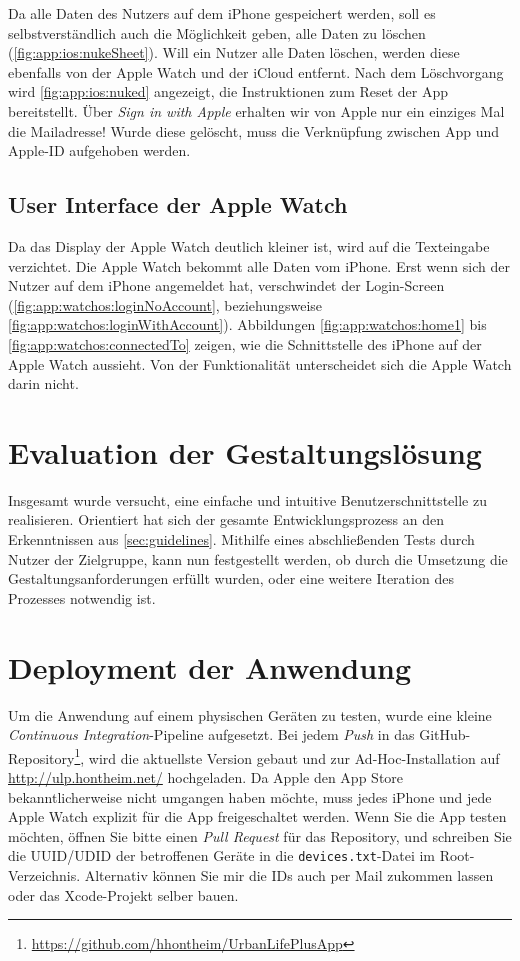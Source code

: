 Da alle Daten des Nutzers auf dem iPhone gespeichert werden, soll es selbstverständlich auch die Möglichkeit geben, alle Daten zu löschen (\autoref{fig:app:ios:nukeSheet}). Will ein Nutzer alle Daten löschen, werden diese ebenfalls von der Apple Watch und der iCloud entfernt. Nach dem Löschvorgang wird \autoref{fig:app:ios:nuked} angezeigt, die Instruktionen zum Reset der App bereitstellt. Über \emph{Sign in with Apple} erhalten wir von Apple nur ein einziges Mal die Mailadresse! Wurde diese gelöscht, muss die Verknüpfung zwischen App und Apple-ID aufgehoben werden.

\subsection{User Interface der Apple Watch}

Da das Display der Apple Watch deutlich kleiner ist, wird auf die Texteingabe verzichtet. Die Apple Watch bekommt alle Daten vom iPhone. Erst wenn sich der Nutzer auf dem iPhone angemeldet hat, verschwindet der Login-Screen (\autoref{fig:app:watchos:loginNoAccount}, beziehungsweise \ref{fig:app:watchos:loginWithAccount}). Abbildungen \ref{fig:app:watchos:home1} bis \ref{fig:app:watchos:connectedTo} zeigen, wie die Schnittstelle des iPhone auf der Apple Watch aussieht. Von der Funktionalität unterscheidet sich die Apple Watch darin nicht.

\section{Evaluation der Gestaltungslösung}

Insgesamt wurde versucht, eine einfache und intuitive Benutzerschnittstelle zu realisieren. Orientiert hat sich der gesamte Entwicklungsprozess an den Erkenntnissen aus \autoref{sec:guidelines}. Mithilfe eines abschließenden Tests durch Nutzer der Zielgruppe, kann nun festgestellt werden, ob durch die Umsetzung die Gestaltungsanforderungen erfüllt wurden, oder eine weitere Iteration des Prozesses notwendig ist.

\section{Deployment der Anwendung}

Um die Anwendung auf einem physischen Geräten zu testen, wurde eine kleine \emph{Continuous Integration}-Pipeline aufgesetzt. Bei jedem \emph{Push} in das GitHub-Repository\footnote{\url{https://github.com/hhontheim/UrbanLifePlusApp}}, wird die aktuellste Version gebaut und zur Ad-Hoc-Installation auf \url{http://ulp.hontheim.net/} hochgeladen. Da Apple den App Store bekanntlicherweise nicht umgangen haben möchte, muss jedes iPhone und jede Apple Watch explizit für die App freigeschaltet werden. Wenn Sie die App testen möchten, öffnen Sie bitte einen \emph{Pull Request} für das Repository, und schreiben Sie die UUID/UDID der betroffenen Geräte in die \texttt{devices.txt}-Datei im Root-Verzeichnis. Alternativ können Sie mir die IDs auch per Mail zukommen lassen oder das Xcode-Projekt selber bauen.


